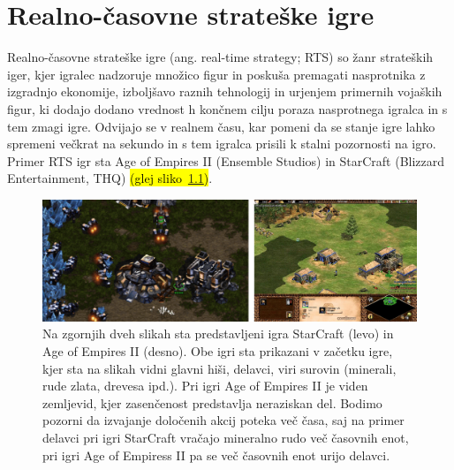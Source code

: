\documentclass[a4paper, 12pt]{book}
\begin{document}
\chapter{Realno-časovne strateške igre}
\label{chrts}

Realno-časovne strateške igre (ang. real-time strategy; RTS) so žanr strateških iger, kjer igralec nadzoruje množico figur in poskuša premagati nasprotnika z izgradnjo ekonomije, izboljšavo raznih tehnologij in urjenjem primernih vojaških figur, ki dodajo dodano vrednost h končnem cilju poraza nasprotnega igralca in s tem zmagi igre.
Odvijajo se v realnem času, kar pomeni da se stanje igre lahko spremeni večkrat na sekundo in s tem igralca prisili k stalni pozornosti na igro.
Primer RTS igr sta Age of Empires II (Ensemble Studios) in StarCraft (Blizzard Entertainment, THQ) \hl{(glej sliko~{\ref{picRtsGames}})}. 

\begin{figure}[h!]
	\begin{center}
		\includegraphics[width=1.0\textwidth]{photos/horizontal_rts.pdf}
	\end{center}
	\caption{Na zgornjih dveh slikah sta predstavljeni igra StarCraft (levo) in Age of Empires II (desno). Obe igri sta prikazani v začetku igre, kjer sta na slikah vidni glavni hiši, delavci, viri surovin (minerali, rude zlata, drevesa ipd.). Pri igri Age of Empires II je viden zemljevid, kjer zasenčenost predstavlja neraziskan del. Bodimo pozorni da izvajanje določenih akcij poteka več časa, saj na primer delavci pri igri StarCraft vračajo mineralno rudo več časovnih enot, pri igri Age of Empiress II pa se več časovnih enot urijo delavci.}
	\label{picRtsGames}
\end{figure}
\end{document}
